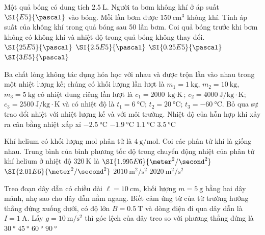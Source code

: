 \begin{ex}
Một quả bóng có dung tích $\SI{2.5}{\liter}$. Người ta bơm không khí ở áp suất $\SI{E5}{\pascal}$ vào bóng. Mỗi lần bơm được $\SI{150}{\centi\meter^3}$ không khí. Tính áp suất của không khí trong quả bóng sau 50 lần bơm. Coi quả bóng trước khi bơm không có không khí và nhiệt độ trong quả bóng không thay đổi.
	\choice
	{$\SI{25E5}{\pascal}$}
	{$\SI{2.5E5}{\pascal}$}
	{$\SI{0.25E5}{\pascal}$}
	{\True $\SI{3E5}{\pascal}$}
\end{ex}
\begin{ex}
	Ba chất lỏng không tác dụng hóa học với nhau và được trộn lẫn vào nhau trong một nhiệt lượng kế; chúng có khối lượng lần lượt là $m_1=\SI{1}{\kilogram}$, $m_2=\SI{10}{\kilogram}$, $m_3=\SI{5}{\kilogram}$ có nhiệt dung riêng lần lượt là $c_1=\SI{2000}{\kilogram\cdot\kelvin}$; $c_2=\SI{4000}{\joule/\kilogram\cdot\kelvin}$; $c_3=\SI{2500}{\joule/\kilogram\cdot\kelvin}$ và có nhiệt độ là $t_1=\SI{6}{\celsius}$; $t_2=\SI{20}{\celsius}$; $t_3=\SI{-60}{\celsius}$. Bỏ qua sự trao đổi nhiệt với nhiệt lượng kế và với môi trường. Nhiệt độ của hỗn hợp khi xảy ra cân bằng nhiệt xấp xỉ
	\choice
	{$\SI{-2.5}{\celsius}$}
	{$\SI{-1.9}{\celsius}$}
	{\True $\SI{1.1}{\celsius}$}
	{$\SI{3.5}{\celsius}$}
\end{ex}
\begin{ex}
	Khí helium có khối lượng mol phân tử là $\SI{4}{\gram/\mole}$. Coi các phân tử khí là giống nhau. Trung bình của bình phương tốc độ trong chuyển động nhiệt của phân tử khí helium ở nhiệt độ $\SI{320}{\kelvin}$ là
	\choice
	{$\SI{1.995E6}{\meter^2/\second^2}$}
	{$\SI{2.01E6}{\meter^2/\second^2}$}
	{$\SI{2010}{\meter^2/\second^2}$}
	{$\SI{2020}{\meter^2/\second^2}$}
\end{ex}
\begin{ex}
	Treo đoạn dây dẫn có chiều dài $\ell=\SI{10}{\centi\meter}$, khối lượng $m=\SI{5}{\gram}$ bằng hai dây mảnh, nhẹ sao cho dây dẫn nằm ngang. Biết cảm ứng từ của từ trường hướng thẳng đứng xuống dưới, có độ lớn $B=\SI{0.5}{\tesla}$ và dòng điện đi qua dây dẫn là $I=\SI{1}{\ampere}$. Lấy $g=\SI{10}{\meter/\second^2}$ thì góc lệch của dây treo so với phương thẳng đứng là
	\choice
	{$\SI{30}{\degree}$}
	{\True $\SI{45}{\degree}$}
	{$\SI{60}{\degree}$}
	{$\SI{90}{\degree}$}
\end{ex}
